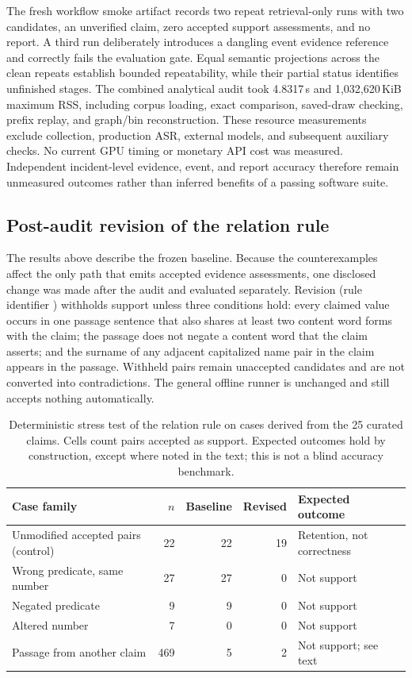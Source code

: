 The fresh workflow smoke artifact records two repeat retrieval-only runs with two candidates, an unverified claim, zero accepted support assessments, and no report. A third run deliberately introduces a dangling event evidence reference and correctly fails the evaluation gate. Equal semantic projections across the clean repeats establish bounded repeatability, while their partial status identifies unfinished stages. The combined analytical audit took 4.8317\,s and 1,032,620\,KiB maximum RSS, including corpus loading, exact comparison, saved-draw checking, prefix replay, and graph/bin reconstruction. These resource measurements exclude collection, production ASR, external models, and subsequent auxiliary checks. No current GPU timing or monetary API cost was measured. Independent incident-level evidence, event, and report accuracy therefore remain unmeasured outcomes rather than inferred benefits of a passing software suite.

\subsection{Post-audit revision of the relation rule}\label{sec:rule-v2}
The results above describe the frozen baseline. Because the counterexamples affect the only path that emits accepted evidence assessments, one disclosed change was made after the audit and evaluated separately. Revision  (rule identifier ) withholds support unless three conditions hold: every claimed value occurs in one passage sentence that also shares at least two content word forms with the claim; the passage does not negate a content word that the claim asserts; and the surname of any adjacent capitalized name pair in the claim appears in the passage. Withheld pairs remain unaccepted candidates and are not converted into contradictions. The general offline runner is unchanged and still accepts nothing automatically.

\begin{table}[!t]
\caption{Deterministic stress test of the relation rule on cases derived from the 25 curated claims. Cells count pairs accepted as support. Expected outcomes hold by construction, except where noted in the text; this is not a blind accuracy benchmark.}\label{tab:rule-v2}
\centering\small
\begin{tabularx}{\textwidth}{@{}YrrrY@{}}
\toprule
Case family & $n$ & Baseline & Revised & Expected outcome\\
\midrule
Unmodified accepted pairs (control) & 22 & 22 & 19 & Retention, not correctness\\
Wrong predicate, same number & 27 & 27 & 0 & Not support\\
Negated predicate & 9 & 9 & 0 & Not support\\
Altered number & 7 & 0 & 0 & Not support\\
Passage from another claim & 469 & 5 & 2 & Not support; see text\\
\bottomrule
\end{tabularx}
\end{table}

